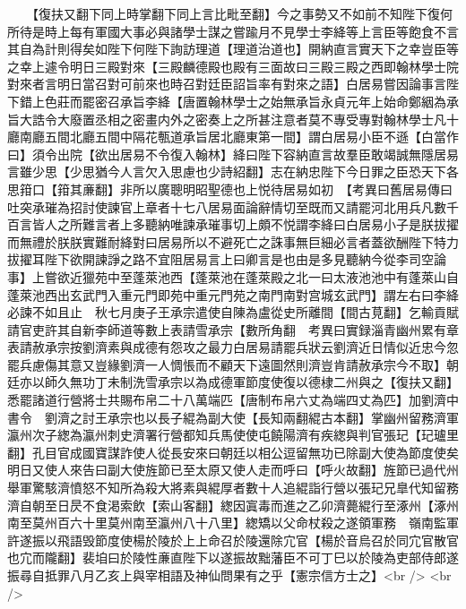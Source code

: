 　　【復扶又翻下同上時掌翻下同上言比毗至翻】今之事勢又不如前不知陛下復何所待是時上每有軍國大事必與諸學士謀之嘗踰月不見學士李絳等上言臣等飽食不言其自為計則得矣如陛下何陛下詢訪理道【理道治道也】開納直言實天下之幸豈臣等之幸上遽令明日三殿對來【三殿麟德殿也殿有三面故曰三殿三殿之西即翰林學士院對來者言明日當召對可前來也時召對廷臣詔旨率有對來之語】白居易嘗因論事言陛下錯上色莊而罷密召承旨李絳【唐置翰林學士之始無承旨永貞元年上始命鄭絪為承旨大誥令大廢置丞相之密畫内外之密奏上之所甚注意者莫不專受專對翰林學士凡十廳南廳五間北廳五間中隔花甎道承旨居北廳東第一間】謂白居易小臣不遜【白當作曰】須令出院【欲出居易不令復入翰林】絳曰陛下容納直言故羣臣敢竭誠無隱居易言雖少思【少思猶今人言欠入思慮也少詩紹翻】志在納忠陛下今日罪之臣恐天下各思箝口【箝其亷翻】非所以廣聰明昭聖德也上悦待居易如初　【考異曰舊居易傳曰吐突承璀為招討使諫官上章者十七八居易面論辭情切至既而又請罷河北用兵凡數千百言皆人之所難言者上多聽納唯諫承璀事切上頗不悦謂李絳曰白居易小子是朕拔擢而無禮於朕朕實難耐絳對曰居易所以不避死亡之誅事無巨細必言者蓋欲酬陛下特力拔擢耳陛下欲開諫諍之路不宜阻居易言上曰卿言是也由是多見聽納今從李司空論事】上嘗欲近獵苑中至蓬萊池西【蓬萊池在蓬萊殿之北一曰太液池池中有蓬萊山自蓬萊池西出玄武門入重元門即苑中重元門苑之南門南對宫城玄武門】謂左右曰李絳必諫不如且止　秋七月庚子王承宗遣使自陳為盧從史所離間【間古莧翻】乞輸貢賦請官吏許其自新李師道等數上表請雪承宗【數所角翻　考異曰實録淄青幽州累有章表請赦承宗按劉濟素與成德有怨攻之最力白居易請罷兵狀云劉濟近日情似近忠今忽罷兵慮傷其意又豈緣劉濟一人惆悵而不顧天下遠圖然則濟豈肯請赦承宗今不取】朝廷亦以師久無功丁未制洗雪承宗以為成德軍節度使復以德棣二州與之【復扶又翻】悉罷諸道行營將士共賜布帛二十八萬端匹【唐制布帛六丈為端四丈為匹】加劉濟中書令　劉濟之討王承宗也以長子緄為副大使【長知兩翻緄古本翻】掌幽州留務濟軍瀛州次子緫為瀛州刺史濟署行營都知兵馬使使屯饒陽濟有疾緫與判官張玘【玘瓐里翻】孔目官成國寶謀詐使人從長安來曰朝廷以相公逗留無功已除副大使為節度使矣明日又使人來告曰副大使旌節已至太原又使人走而呼曰【呼火故翻】旌節已過代州舉軍驚駭濟憤怒不知所為殺大將素與緄厚者數十人追緄詣行營以張玘兄臯代知留務濟自朝至日昃不食渇索飲【索山客翻】緫因寘毒而進之乙卯濟薨緄行至涿州【涿州南至莫州百六十里莫州南至瀛州八十八里】緫矯以父命杖殺之遂領軍務　嶺南監軍許遂振以飛語毁節度使楊於陵於上上命召於陵還除宂官【楊於音烏召於同宂官散官也宂而隴翻】裴垍曰於陵性亷直陛下以遂振故黜藩臣不可丁巳以於陵為吏部侍郎遂振尋自抵罪八月乙亥上與宰相語及神仙問果有之乎【憲宗信方士之】<br />
<br />
